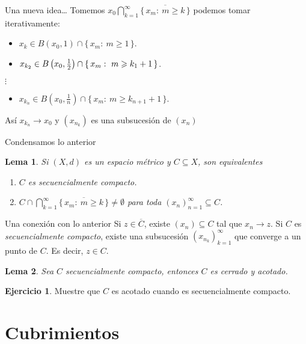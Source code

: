 \documentclass[utf8]{beamer}
\theoremstyle{plain}
\newtheorem{Lem}{Lema}                 %
\theoremstyle{definition}
\newtheorem{Ej}{Ejercicio}             %
\theoremstyle{remark}
\numberwithin{equation}{section}
\newcommand{\set}[1]{\{\,#1\,\}}    %
\renewcommand{\geq}{\geqslant}          %
\newcommand{\ov}{\overline}
\newcommand{\half}{{\mathchoice{\nhalf}{\thalf}{\shalf}{\shalf}}} %
\newcommand{\nhalf}{\frac{1}{2}}
\newcommand{\shalf}{{\scriptstyle\frac{1}{2}}} %
\newcommand{\thalf}{{\tfrac{1}{2}}} %
\begin{document}
\begin{frame}{Una nueva idea\dots}
  Tomemos $x_0\bigcap_{k=1}^\infty\ov{\set{x_m:\ m\geq k}}$ podemos tomar iterativamente:
  \begin{itemize}
    \item $x_k\in B(x_0,1)\cap\set{x_m:\ m\geq 1}$.
    \item $x_{k_2}\in B\left(x_0,\half\right)\cap\set{x_m:\ m\geq k_1+1}$.
  \end{itemize}
  \hspace{1cm}$\vdots$
  \begin{itemize}
    \item $x_{k_n}\in B\left(x_0,\frac1n\right)\cap\set{x_m:\ m\geq k_{n+1}+1}$.
  \end{itemize}
  As\'i $x_{k_n}\to x_0$ y $(x_{n_k})$ es una subsucesi\'on de $(x_n)$
\end{frame}

\begin{frame}{Condensamos lo anterior}
  \begin{Lem}\label{lem:equivSecCompYEncajados}
    Si $(X,d)$ es un espacio m\'etrico y $C\subseteq X$, son equivalentes
    \begin{enumerate}
      \item $C$ es secuencialmente compacto.
      \item $C\cap \bigcap_{k=1}^\infty\ov{\set{x_m:\ m\geq k}}\neq \emptyset$ para toda $(x_n)_{n=1}^\infty\subseteq C$.
    \end{enumerate}
  \end{Lem}
\end{frame}

\begin{frame}{Una conexi\'on con lo anterior}
  Si $z\in\ov C$, existe $(x_n)\subseteq C$ tal que $x_n\to z$. Si $C$ es \emph{secuencialmente compacto}, existe una subsucesi\'on $(x_{n_k})_{k=1}^\infty$ que converge a un punto de $C$. Es decir, $z\in C$. 
  \begin{Lem}\label{lem:equiv1Compacidad}
Sea $C$ secuencialmente compacto, entonces $C$ es cerrado y acotado.
  \end{Lem}

  \begin{Ej}
    Muestre que $C$ es acotado cuando es secuencialmente compacto.
  \end{Ej}
\end{frame}

\section{Cubrimientos}
\end{document}
